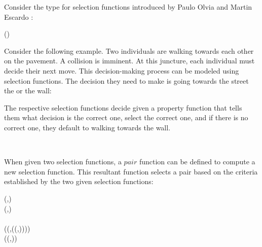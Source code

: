 Consider the type for selection functions introduced by Paulo Olvia and Martin Escardo 
\cite{escardo2010selection} :
\begin{hscode}\SaveRestoreHook
{}%
%
%
\>[3]{}\;\;\;\mathrel{=}(\to {})\to {}\<[E]%
\ColumnHook
\end{hscode}\resethooks
Consider the following example. Two individuals are walking towards each other on the 
pavement. A collision is imminent. At this juncture, each individual must decide their 
next move. This decision-making process can be modeled using selection functions. The 
decision they need to make is going towards the street the or the wall:
\begin{hscode}\SaveRestoreHook
{}%
%
%
\>[3]{}\;\mathrel{=}\mid {}\;\;\<[E]%
\ColumnHook
\end{hscode}\resethooks
The respective selection functions decide given a property function that tells them what 
decision is the correct one, select the correct one, and if there is no correct one, they 
default to walking towards the wall.
\begin{hscode}\SaveRestoreHook
{}%
%
%
\>[3]{}\mathbin{::}\;\;\<[E]%
\\
\>[3]{}\;\mathrel{=}\;\;\;\;\;\;\<[E]%
\ColumnHook
\end{hscode}\resethooks
When given two selection functions, a $pair$ function can be defined to compute a new 
selection function. This resultant function selects a pair based on the criteria 
established by the two given selection functions:
\begin{hscode}\SaveRestoreHook
{}%
%
%
%
%
\>[3]{}\mathbin{::}\;\;\to {}\;\;\to {}\;\;(,){}\<[E]%
\\
\>[3]{}\;\;\;\mathrel{=}(,){}\<[E]%
\\
\>[3]{}\<[5]%
\>[5]{}\<[E]%
\\
\>[5]{}\<[9]%
\>[9]{}\mathrel{=}\;(\lambda {}\to {}\;(,\;(\lambda {}\to {}\;(,)))){}\<[E]%
\\
\>[5]{}\<[9]%
\>[9]{}\mathrel{=}\;(\lambda {}\to {}\;(,)){}\<[E]%
\ColumnHook
\end{hscode}\resethooks

